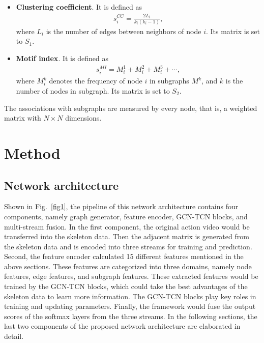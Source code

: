\documentclass[journal]{IEEEtran}
\begin{document}
\begin{itemize}

    \item \textbf{Clustering coefficient}. It is defined as
        \begin{align}
          s_{i}^{CC}=\frac{2L_i}{k_i(k_i-1)},
        \label{eq15}
        \end{align}
        where $L_i$ is the number of edges between neighbors of node $i$. Its matrix is set to $S_1$.
    \item \textbf{Motif index}. It is defined as
        \begin{align}
          s_{i}^{MI}=M_{i}^{1}+M_{i}^{2}+M_{i}^{3}+\cdots,
        \label{eq16}
        \end{align}
        where $M_{i}^{k}$ denotes the frequency of node $i$ in subgraphs $M^k$, and $k$ is the number of nodes in subgraph. Its matrix is set to $S_2$.
\end{itemize}

The associations with subgraphs are measured by every node, that is, a weighted matrix with $N \times N$ dimensions.

\section{Method}

\subsection{Network architecture}

Shown in Fig.~\ref{fig1}, the pipeline of this network architecture contains four components, namely graph generator, feature encoder, GCN-TCN blocks, and multi-stream fusion. In the first component, the original action video would be transferred into the skeleton data. Then the adjacent matrix is generated from the skeleton data and is encoded into three streams for training and prediction. Second, the feature encoder calculated 15 different features mentioned in the above sections. These features are categorized into three domains, namely node features, edge features, and subgraph features. These extracted features would be trained by the GCN-TCN blocks, which could take the best advantages of the skeleton data to learn more information. The GCN-TCN blocks play key roles in training and updating parameters. Finally, the framework would fuse the output scores of the softmax layers from the three streams. In the following sections, the last two components of the proposed network architecture are elaborated in detail.
\end{document}
